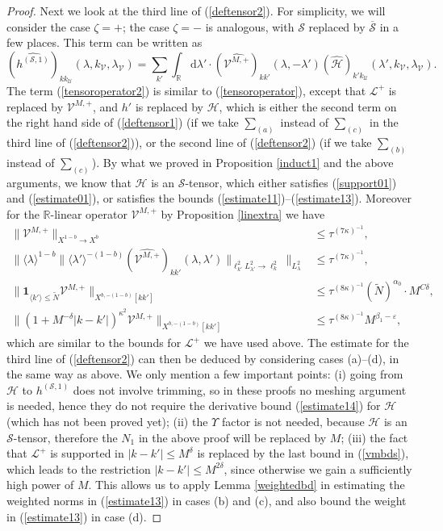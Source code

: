 \documentclass[11 pt,reqno]{amsart}
\theoremstyle{definition}
\theoremstyle{remark}
\numberwithin{equation}{section}
\newcommand{\Sc}{\mathcal{S}}
\newcommand{\Uc}{\mathcal{U}}
\newcommand{\Vc}{\mathcal{V}}
\newcommand{\Rb}{\mathbb{R}}
\newcommand{\Hc}{\mathcal{H}}
\newcommand{\Ls}{\mathscr{L}}
\newcommand{\Vs}{\mathscr{V}}
\begin{document}
{\begin{proof}
Next we look at the third line of (\ref{deftensor2}). For simplicity, we will consider the case $\zeta=+$; the case $\zeta=-$ is analogous, with $\Sc$ replaced by $\overline{\Sc}$ in a few places. This term can be written as
\begin{equation}\label{tensoroperator2}(\widehat{h^{(\Sc,1)}})_{kk_\Uc}(\lambda,k_\Vc,\lambda_\Vc)=\sum_{k'}\int_\Rb\mathrm{d}\lambda'\cdot(\widehat{\Vs^{M,+}})_{kk'}(\lambda,-\lambda')(\widehat{\Hc})_{k'k_\Uc}(\lambda',k_\Vc,\lambda_\Vc).
\end{equation} 
The term (\ref{tensoroperator2}) is similar to (\ref{tensoroperator}), except that $\Ls^{+}$ is replaced by $\Vs^{M,+}$, and $h'$ is replaced by $\mathcal{H}$, which is either the second term on the right hand side of (\ref{deftensor1}) (if we take $\sum_{(a)}$ instead of $\sum_{(c)}$ in the third line of (\ref{deftensor2})), or the second line of (\ref{deftensor2}) (if we take $\sum_{(b)}$ instead of $\sum_{(c)}$). By what we proved in Proposition \ref{induct1} and the above arguments, we know that $\Hc$ is an $\Sc$-tensor, which either satisfies (\ref{support01}) and (\ref{estimate01}), or satisfies the bounds (\ref{estimate11})--(\ref{estimate13}). Moreover for the $\Rb$-linear operator $\Vs^{M,+}$ by Proposition \ref{linextra} we have
\begin{equation}\label{vmbds}
\begin{aligned}\|\Vs^{M,+}\|_{X^{1-b}\to X^b}&\leq\tau^{(7\kappa)^{-1}},\\
\big\|\langle\lambda\rangle^{1-b}\|\langle\lambda'\rangle^{-(1-b)}(\widehat{\Vs^{M,+}})_{kk'}(\lambda,\lambda')\|_{\ell_{k'}^2L_{\lambda'}^2\to\ell_k^2}\big\|_{L_\lambda^2}&\leq \tau^{(7\kappa)^{-1}},\\
\|\mathbf{1}_{\langle k'\rangle\leq \widetilde{N}}\Vs^{M,+}\|_{X^{b,-(1-b)}[kk']}&\leq \tau^{(8\kappa)^{-1}}(\widetilde{N})^{\alpha_0}\cdot M^{C\delta},\\
\|(1+M^{-\delta}|k- k'|)^{\kappa^2}\Vs^{M,+}\|_{X^{b,-(1-b)}[k k']}&\leq \tau^{(8\kappa)^{-1}}M^{\beta_1-\varepsilon},
\end{aligned}
\end{equation} which are similar to the bounds for $\Ls^+$ we have used above. The estimate for the third line of (\ref{deftensor2}) can then be deduced by considering cases (a)--(d), in the same way as above. We only mention a few important points: (i) going from $\Hc$ to $h^{(\Sc,1)}$ does not involve trimming, so in these proofs no meshing argument is needed, hence they do not require the derivative bound (\ref{estimate14}) for $\Hc$ (which has not been proved yet); (ii) the $\Upsilon$ factor is not needed, because $\Hc$ is an $\Sc$-tensor, therefore the $N_1$ in the above proof will be replaced by $M$; (iii) the fact that $\Ls^+$ is supported in $|k- k'|\leq M^\delta$ is replaced by the last bound in (\ref{vmbds}), which leads to the restriction $|k- k'|\leq M^{2\delta}$, since otherwise we gain a sufficiently high power of $M$. This allows us to apply Lemma \ref{weightedbd} in estimating the weighted norms in (\ref{estimate13}) in cases (b) and (c), and also bound the weight in (\ref{estimate13}) in case (d).


\end{proof}}
\end{document}
